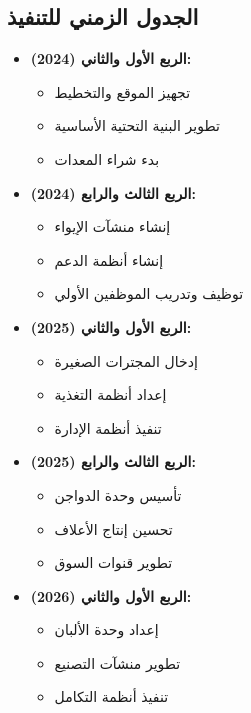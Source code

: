\subsection{الجدول الزمني للتنفيذ}
\begin{itemize}
    \item \textbf{الربع الأول والثاني (2024):}
    \begin{itemize}
        \item تجهيز الموقع والتخطيط
        \item تطوير البنية التحتية الأساسية
        \item بدء شراء المعدات
    \end{itemize}
    
    \item \textbf{الربع الثالث والرابع (2024):}
    \begin{itemize}
        \item إنشاء منشآت الإيواء
        \item إنشاء أنظمة الدعم
        \item توظيف وتدريب الموظفين الأولي
    \end{itemize}
    
    \item \textbf{الربع الأول والثاني (2025):}
    \begin{itemize}
        \item إدخال المجترات الصغيرة
        \item إعداد أنظمة التغذية
        \item تنفيذ أنظمة الإدارة
    \end{itemize}
    
    \item \textbf{الربع الثالث والرابع (2025):}
    \begin{itemize}
        \item تأسيس وحدة الدواجن
        \item تحسين إنتاج الأعلاف
        \item تطوير قنوات السوق
    \end{itemize}
    
    \item \textbf{الربع الأول والثاني (2026):}
    \begin{itemize}
        \item إعداد وحدة الألبان
        \item تطوير منشآت التصنيع
        \item تنفيذ أنظمة التكامل
    \end{itemize}
    

\end{itemize}
